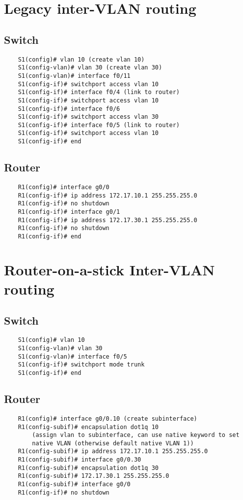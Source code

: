 \documentclass[10pt, a4paper]{article}
\begin{document}
	\section{Legacy inter-VLAN routing}
	\subsection{Switch}
	\begin{lstlisting}
	S1(config)# vlan 10 (create vlan 10)
	S1(config-vlan)# vlan 30 (create vlan 30)
	S1(config-vlan)# interface f0/11
	S1(config-if)# switchport access vlan 10
	S1(config-if)# interface f0/4 (link to router)
	S1(config-if)# switchport access vlan 10
	S1(config-if)# interface f0/6
	S1(config-if)# switchport access vlan 30
	S1(config-if)# interface f0/5 (link to router)
	S1(config-if)# switchport access vlan 10
	S1(config-if)# end
	\end{lstlisting}
	
	\subsection{Router}
	\begin{lstlisting}
	R1(config)# interface g0/0
	R1(config-if)# ip address 172.17.10.1 255.255.255.0
	R1(config-if)# no shutdown
	R1(config-if)# interface g0/1
	R1(config-if)# ip address 172.17.30.1 255.255.255.0
	R1(config-if)# no shutdown
	R1(config-if)# end
	\end{lstlisting}
	
	\section{Router-on-a-stick Inter-VLAN routing}
	\subsection{Switch}
	\begin{lstlisting}
	S1(config)# vlan 10
	S1(config-vlan)# vlan 30
	S1(config-vlan)# interface f0/5
	S1(config-if)# switchport mode trunk
	S1(config-if)# end
	\end{lstlisting}
	
	\subsection{Router}
	\begin{lstlisting}
	R1(config)# interface g0/0.10 (create subinterface)
	R1(config-subif)# encapsulation dot1q 10 
		(assign vlan to subinterface, can use native keyword to set 
		native VLAN (otherwise default native VLAN 1))
	R1(config-subif)# ip address 172.17.10.1 255.255.255.0
	R1(config-subif)# interface g0/0.30
	R1(config-subif)# encapsulation dot1q 30
	R1(config-subif)# 172.17.30.1 255.255.255.0
	R1(config-subif)# interface g0/0
	R1(config-if)# no shutdown
	\end{lstlisting}
	
\end{document}

